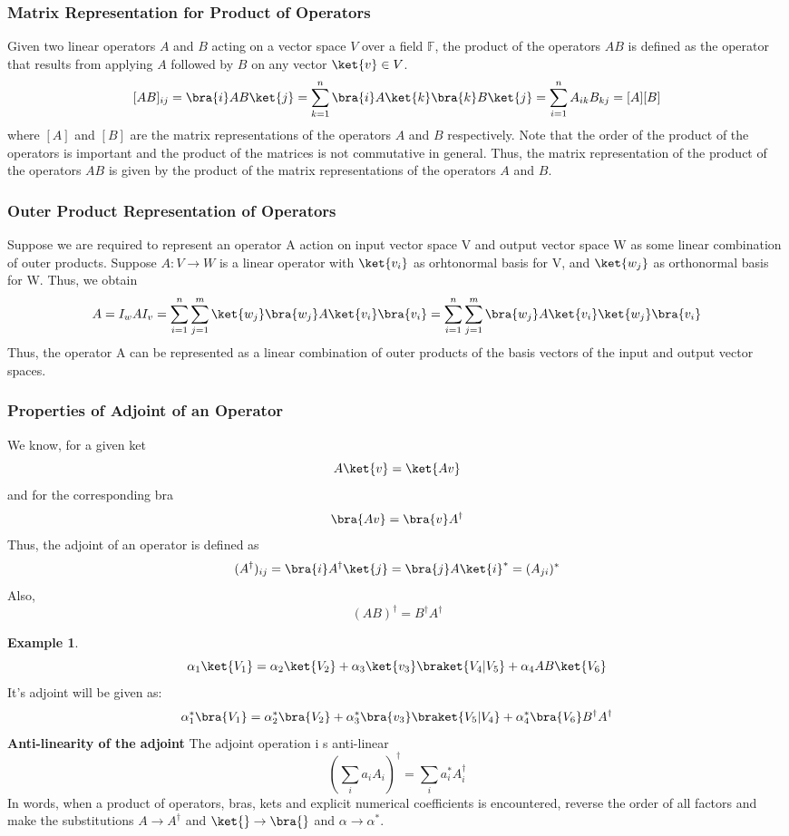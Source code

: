 \documentclass[12pt, oneside]{book}
\theoremstyle{definition}
\theoremstyle{definition}
\newtheorem{example}{Example}[section]
\theoremstyle{remark}
\begin{document}
\subsubsection{Matrix Representation for Product of Operators}
Given two linear operators $A$ and $B$ acting on a vector space $V$ over a field $\mathbb{F}$, the product of the operators $AB$ is defined as the operator that results from applying $A$ followed by $B$ on any vector $\ket{v}\in V$.
\[[AB]_{ij}=\bra{i}AB\ket{j}=\sum_{k=1}^n \bra{i}A\ket{k}\bra{k}B\ket{j}=\sum_{i=1}^n A_{ik}B_{kj}=[A][B]\]
where $[A]$ and $[B]$ are the matrix representations of the operators $A$ and $B$ respectively. Note that the order of the product of the operators is important and the product of the matrices is not commutative in general. 
Thus, the matrix representation of the product of the operators $AB$ is given by the product of the matrix representations of the operators $A$ and $B$.

\subsubsection{Outer Product Representation of Operators}
Suppose we are required to represent an operator A action on input vector space V and output vector space W as some linear 
combination of outer products. Suppose $A:V\rightarrow W$ is a linear operator with $\ket{v_i}$ as orhtonormal basis for V, and $\ket{w_j}$ as
orthonormal basis for W. Thus, we obtain
\[ A = I_w A I_v = \sum_{i=1}^n \sum_{j=1}^m \ket{w_j}\bra{w_j}A\ket{v_i}\bra{v_i}=\sum_{i=1}^n \sum_{j=1}^m \bra{w_j}A\ket{v_i} \ket{w_j}\bra{v_i} \]
Thus, the operator A can be represented as a linear combination of outer products of the basis vectors of the input and output vector spaces.

\subsubsection{Properties of Adjoint of an Operator}
We know, for a given ket
\[A\ket{v}=\ket{Av}\]
and for the corresponding bra
\[\bra{Av}=\bra{v}A^{\dagger}\]
Thus, the adjoint of an operator is defined as
\[ (A^{\dagger})_{ij}=\bra{i}A^{\dagger}\ket{j}=\bra{j}A\ket{i}^*=(A_{ji})^* \]
Also,
\[ (AB)^{\dagger}=B^{\dagger}A^{\dagger} \]
\begin{example}
    \[\alpha_1\ket{V_1}=\alpha_2\ket{V_2}+\alpha_3\ket{v_3}\braket{V_4|V_5} + \alpha_4AB\ket{V_6}\]
    It's adjoint will be given as:
    \[\alpha_1^*\bra{V_1}=\alpha_2^*\bra{V_2}+\alpha_3^*\bra{v_3}\braket{V_5|V_4} + \alpha_4^*\bra{V_6}B^{\dagger}A^{\dagger}\]
    \textbf{Anti-linearity of the adjoint} The adjoint operation i s anti-linear
    \[
        \left(\sum_ia_iA_i\right)^{\dagger}=\sum_i a_i^* A_i^{\dagger}
    \]
    In words, when a product of operators, bras, kets and explicit numerical coefficients is encountered, reverse the order of all factors 
    and make the substitutions $A \rightarrow A^{\dagger}$ and $\ket{} \rightarrow \bra{}$ and $\alpha \rightarrow \alpha^*$.
\end{example}
\end{document}
